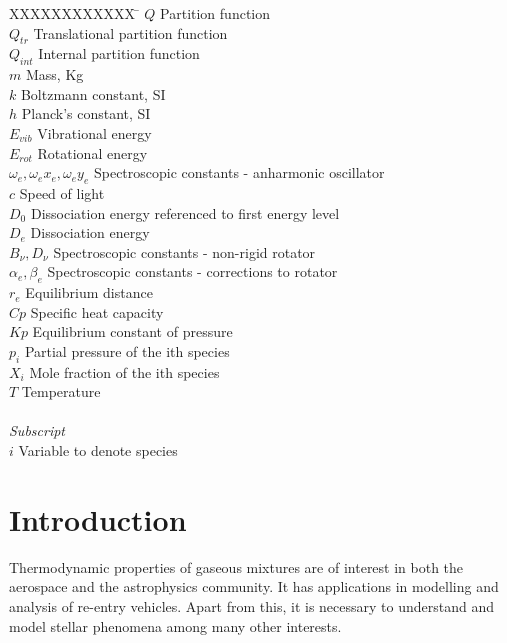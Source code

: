 \documentclass[]{aelab_aiaa-tc}%
\begin{document}
\begin{tabbing}
	XXXXXXXXXXXX \= \kill%
	$Q$ \> Partition function \\
	$Q_{tr}$ \> Translational partition function \\
	$Q_{int}$ \> Internal partition function \\
	$m$ \> Mass, Kg \\
	$k$ \> Boltzmann constant, SI \\
	$h$ \> Planck's constant, SI \\
	$E_{vib}$ \> Vibrational energy \\
	$E_{rot}$ \> Rotational energy \\
	$\omega_{e}, \omega_{e}x_e, \omega_{e}y_e$ \> Spectroscopic constants - anharmonic oscillator \\
	$c$ \> Speed of light \\
	$D_0$ \> Dissociation energy referenced to first energy level\\
	$D_e$ \> Dissociation energy\\
	$B_\nu, D_\nu$ \> Spectroscopic constants - non-rigid rotator \\
	$\alpha_e, \beta_e$ \> Spectroscopic constants - corrections to rotator \\
	$r_e$ \> Equilibrium distance \\
	$Cp$ \> Specific heat capacity \\
	$Kp$ \> Equilibrium constant of pressure \\
	$p_i$ \> Partial pressure of the ith species \\
	$X_i$ \> Mole fraction of the ith species \\
	$T$ \> Temperature \\[5pt] \\
	
	
	\textit{Subscript}\\
	$i$ \> Variable to denote species \\
\end{tabbing}

\section{Introduction}
Thermodynamic properties of gaseous mixtures are of interest in both the aerospace and the astrophysics community. It has applications in modelling and analysis of re-entry vehicles. Apart from this, it is necessary to understand and model stellar phenomena among many other interests.
\end{document}

